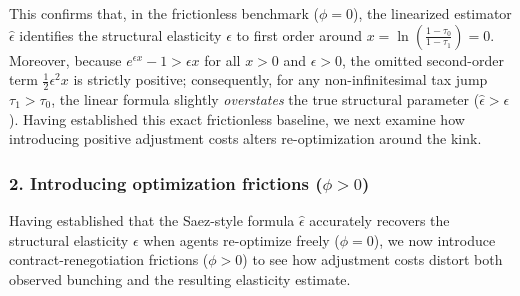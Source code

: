 This confirms that, in the frictionless benchmark ($\phi = 0$), the linearized estimator $\hat{\epsilon}$ identifies the structural elasticity $\epsilon$ to first order around $x = \ln\!\left(\frac{1-\tau_0}{1-\tau_1}\right) = 0$. Moreover, because $e^{\epsilon x} - 1 > \epsilon x$ for all $x > 0$ and $\epsilon > 0$, the omitted second-order term $\frac{1}{2}\epsilon^2 x$ is strictly positive; consequently, for any non-infinitesimal tax jump $\tau_1 > \tau_0$, the linear formula slightly \emph{overstates} the true structural parameter ($\hat{\epsilon} > \epsilon$). Having established this exact frictionless baseline, we next examine how introducing positive adjustment costs alters re-optimization around the kink.

\subsubsection*{2. Introducing optimization frictions ($\phi > 0$)}

Having established that the Saez-style formula $\hat{\epsilon}$ accurately recovers the structural elasticity $\epsilon$ when agents re-optimize freely ($\phi = 0$), we now introduce contract-renegotiation frictions ($\phi > 0$) to see how adjustment costs distort both observed bunching and the resulting elasticity estimate.

